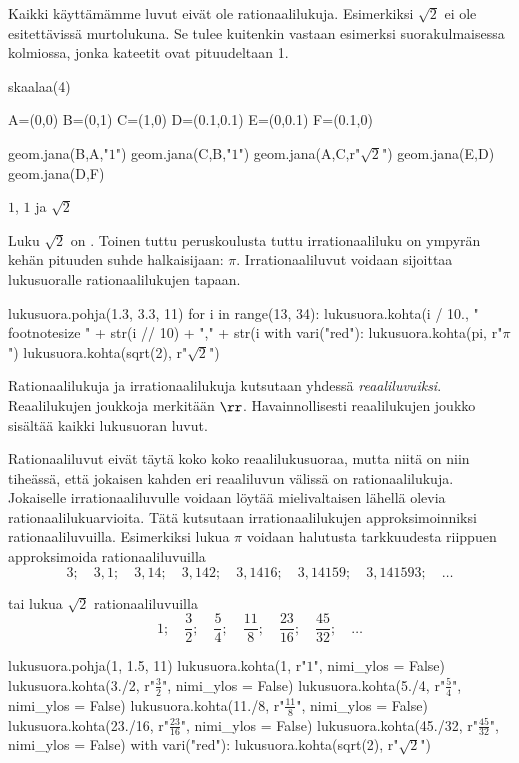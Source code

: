 Kaikki käyttämämme luvut eivät ole rationaalilukuja. Esimerkiksi $\sqrt{2}$ ei ole esitettävissä murtolukuna. Se tulee kuitenkin vastaan esimerksi suorakulmaisessa kolmiossa, jonka kateetit ovat pituudeltaan 1.


\begin{kuva}
	skaalaa(4)

	A=(0,0)
	B=(0,1)
	C=(1,0)
	D=(0.1,0.1)
	E=(0,0.1)
	F=(0.1,0)

	geom.jana(B,A,"$1$")
	geom.jana(C,B,"$1$")
	geom.jana(A,C,r"$\sqrt{2}$")
	geom.jana(E,D)
	geom.jana(D,F)
\end{kuva}


$1$, $1$ ja $\sqrt{2}$

Luku $\sqrt{2}$ on . Toinen tuttu peruskoulusta tuttu irrationaaliluku on ympyrän kehän pituuden suhde halkaisijaan: $\pi$. Irrationaaliluvut voidaan sijoittaa
lukusuoralle rationaalilukujen tapaan.

\begin{kuva}
lukusuora.pohja(1.3, 3.3, 11)
for i in range(13, 34):
	lukusuora.kohta(i / 10., "\\footnotesize " + str(i // 10) + "," + str(i %
with vari("red"):
	lukusuora.kohta(pi, r"$\pi$")
	lukusuora.kohta(sqrt(2), r"$\sqrt{2}$")
\end{kuva}



Rationaalilukuja ja irrationaalilukuja kutsutaan yhdessä \emph{reaaliluvuiksi}. Reaalilukujen joukkoja merkitään $\rr$.
Havainnollisesti reaalilukujen joukko sisältää kaikki lukusuoran luvut.

Rationaaliluvut eivät täytä koko koko reaalilukusuoraa, mutta niitä on niin tiheässä, että jokaisen kahden eri reaaliluvun välissä on rationaalilukuja. Jokaiselle irrationaaliluvulle voidaan löytää mielivaltaisen lähellä olevia rationaalilukuarvioita. Tätä kutsutaan irrationaalilukujen approksimoinniksi rationaaliluvuilla. Esimerkiksi lukua $\pi$ voidaan halutusta tarkkuudesta riippuen approksimoida rationaaliluvuilla
\[
3; \quad 3,1; \quad 3,14; \quad 3,142; \quad 3,1416; \quad 3,14159; \quad 3,141593; \quad \ldots 
\]

tai lukua $\sqrt{2}$ rationaaliluvuilla
\[
1; \quad \frac{3}{2}; \quad \frac{5}{4}; \quad \frac{11}{8}; \quad \frac{23}{16}; \quad \frac{45}{32}; \quad \ldots 
\]

\begin{kuva}
lukusuora.pohja(1, 1.5, 11)
lukusuora.kohta(1, r"\footnotesize $1$", nimi_ylos = False)
lukusuora.kohta(3./2, r"\footnotesize $\frac{3}{2}$", nimi_ylos = False)
lukusuora.kohta(5./4, r"\footnotesize $\frac{5}{4}$", nimi_ylos = False)
lukusuora.kohta(11./8, r"\footnotesize $\frac{11}{8}$", nimi_ylos = False)
lukusuora.kohta(23./16, r"\footnotesize $\frac{23}{16}$", nimi_ylos = False)
lukusuora.kohta(45./32, r"\footnotesize $\frac{45}{32}$", nimi_ylos = False)
with vari("red"):
	lukusuora.kohta(sqrt(2), r"$\sqrt{2}$")
\end{kuva}

